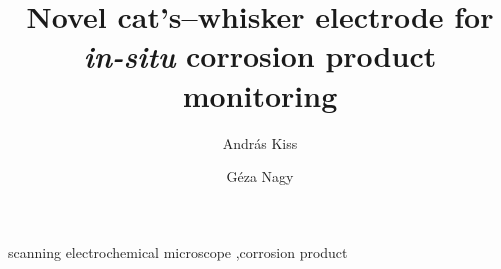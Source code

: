 \documentclass[3p]{elsarticle}
\begin{document}
\begin{frontmatter}

\title{Novel cat's--whisker electrode for \emph{in-situ} corrosion product monitoring}
\author[akiss]{Andr\'{a}s Kiss}
\address[akiss, gnagy]{Department of General and Physical Chemistry, Faculty of Sciences, University of P\'{e}cs, 7624 P\'{e}cs, Ifj\'{u}s\'{a}g \'{u}tja 6, Hungary}
\address[akiss, gnagy]{J\'{a}nos Szent\'{a}gothai Research Centre, University of P\'{e}cs, 7624 P\'{e}cs, Ifj\'{u}s\'{a}g \'{u}tja 20, Hungary}
\author[gnagy]{G\'{e}za Nagy}

\begin{abstract}
\end{abstract}

\begin{keyword}
	scanning electrochemical microscope \sep corrosion product
\end{keyword}
\end{frontmatter}
\end{document}
